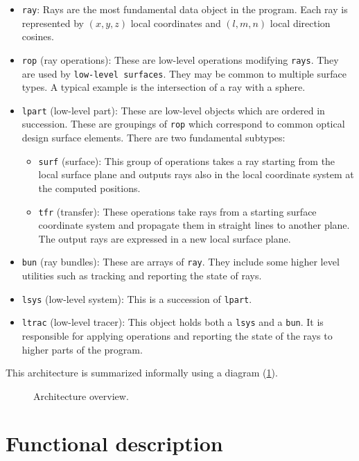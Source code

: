 \begin{itemize}
\item \lstinline{ray}: Rays are the most fundamental data object in the
program.  Each ray is represented by $(x, y, z)$ local coordinates and $(l, m,
n)$ local direction cosines.
\item \lstinline{rop} (ray operations): These are low-level operations
modifying \lstinline{rays}.  They are used by \lstinline{low-level surfaces}.
They may be common to multiple surface types. A typical example is the
intersection of a ray with a sphere.
\item \lstinline{lpart} (low-level part): These are low-level objects which
are ordered in succession. These are groupings of \lstinline{rop}
which correspond to common optical design surface elements. There are two
fundamental subtypes:
\begin{itemize}
\item \lstinline{surf} (surface): This group of operations takes a ray starting
from the local surface plane and outputs rays also in the local coordinate
system at the computed positions.
\item \lstinline{tfr} (transfer): These operations take rays from a starting
surface coordinate system and propagate them in straight lines to another
plane. The output rays are expressed in a new local surface plane.
\end{itemize}
\item \lstinline{bun} (ray bundles): These are arrays of \lstinline{ray}. They
include some higher level utilities such as tracking and reporting the state of
rays.
\item \lstinline{lsys} (low-level system): This is a succession of
\lstinline{lpart}.
\item \lstinline{ltrac} (low-level tracer): This object holds both a
\lstinline{lsys} and a \lstinline{bun}. It is responsible for applying
operations and reporting the state of the rays to higher parts of the program.
\end{itemize}

This architecture is summarized informally using a diagram
(\cref{fig:arch-overview}).

\begin{figure} 

\caption{\label{fig:arch-overview} Architecture overview.}
\end{figure}

\section{Functional description}

